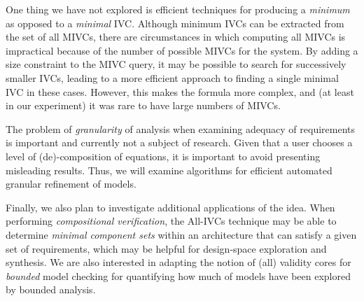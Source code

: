One thing we have not explored is efficient techniques for producing a {\em minimum} as opposed to a {\em minimal} IVC.  Although minimum IVCs can be extracted from the set of all MIVCs, there are circumstances in which computing all MIVCs is impractical because of the number of possible MIVCs for the system.  By adding a size constraint to the MIVC query, it may be possible to search for successively smaller IVCs, leading to a more efficient approach to finding a single minimal IVC in these cases.  However, this makes the formula more complex, and (at least in our experiment) it was rare to have large numbers of MIVCs.

The problem of {\em granularity} of analysis when examining adequacy of requirements is important and currently not a subject of research.  Given that a user chooses a level of (de)-composition of equations, it is important to avoid presenting misleading results.  Thus, we will examine algorithms for efficient automated granular refinement of models.

Finally, we also plan to investigate additional applications of the idea.  When performing {\em compositional verification}, the All-IVCs technique may be able to determine {\em minimal component sets} within an architecture that can satisfy a given set of requirements, which may be helpful for design-space exploration and synthesis. We are also interested in adapting the notion of (all) validity cores for \emph{bounded} model checking for quantifying how much of models have been explored by bounded analysis. 